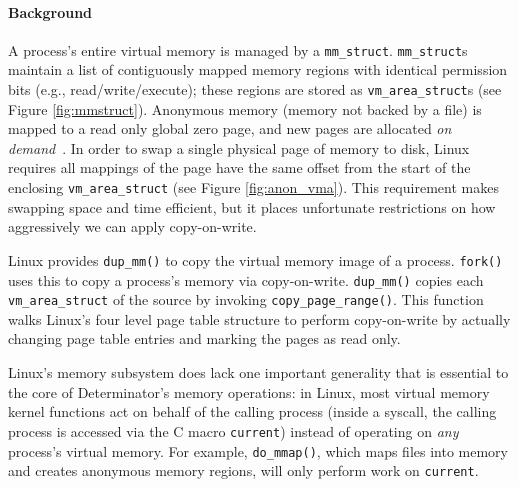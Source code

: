 \begin{itemize}
\paragraph{Background}
A process's entire virtual memory is managed by a {\tt mm\_struct}.
{\tt mm\_struct}s maintain a list of contiguously mapped memory regions with
identical permission bits (e.g., read/write/execute); these regions are stored as
{\tt vm\_area\_struct}s (see Figure \ref{fig:mmstruct}). Anonymous memory
(memory not backed by a file) is mapped to a
read only global zero page, and new pages
are allocated \emph{on demand}~\cite{li1989memory}. In order to swap a single
physical page of memory to disk, Linux requires all mappings of the page have
the same offset from the start of the enclosing {\tt vm\_area\_struct} (see
Figure \ref{fig:anon_vma}). This
requirement makes swapping space and time efficient, but it places unfortunate
restrictions on how aggressively we can apply copy-on-write.

Linux provides {\tt dup\_mm()} to copy the virtual memory image of a process.
{\tt fork()} uses this to copy a process's memory via copy-on-write.
{\tt dup\_mm()} copies each {\tt vm\_area\_struct} of the source by invoking
{\tt copy\_page\_range()}. This function walks Linux's four level
page table structure to perform copy-on-write by actually changing page table
entries and marking the pages as read only.

Linux's memory subsystem does lack one important generality that is essential to
the core of Determinator's memory operations: in Linux, most virtual memory
kernel functions act on behalf
of the calling process (inside a syscall, the calling process is accessed via
the C macro {\tt current}) instead of operating on \emph{any} process's
virtual memory. For example, {\tt do\_mmap()}, which maps files into memory and
creates anonymous memory regions, will only perform work on {\tt current}.

\end{itemize}
